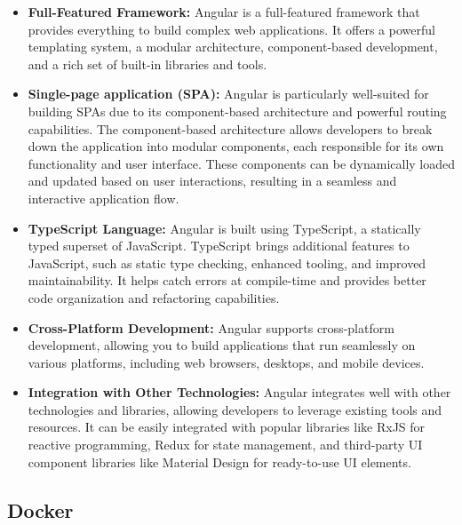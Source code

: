 \documentclass[
12pt,
oneside, 
onehalfspacing, 
nolistspacing, 
parskip, 
chapterinoneline, 
]{AASTCOMPUTER}
\begin{document}
\begin{itemize}
\item \textbf{Full-Featured Framework:} Angular is a full-featured framework that provides everything to build complex web applications. It offers a powerful templating system, a modular architecture, component-based development, and a rich set of built-in libraries and tools.

\item \textbf{Single-page application (SPA):} Angular is particularly well-suited for building SPAs due to its component-based architecture and powerful routing capabilities. The component-based architecture allows developers to break down the application into modular components, each responsible for its own functionality and user interface. These components can be dynamically loaded and updated based on user interactions, resulting in a seamless and interactive application flow.

\item \textbf{TypeScript Language:} Angular is built using TypeScript, a statically typed superset of JavaScript. TypeScript brings additional features to JavaScript, such as static type checking, enhanced tooling, and improved maintainability. It helps catch errors at compile-time and provides better code organization and refactoring capabilities.

\item \textbf{Cross-Platform Development:} Angular supports cross-platform development, allowing you to build applications that run seamlessly on various platforms, including web browsers, desktops, and mobile devices.

\item \textbf{Integration with Other Technologies:} Angular integrates well with other technologies and libraries, allowing developers to leverage existing tools and resources. It can be easily integrated with popular libraries like RxJS for reactive programming, Redux for state management, and third-party UI component libraries like Material Design for ready-to-use UI elements.
\end{itemize}

\subsection{Docker}
\end{document}
